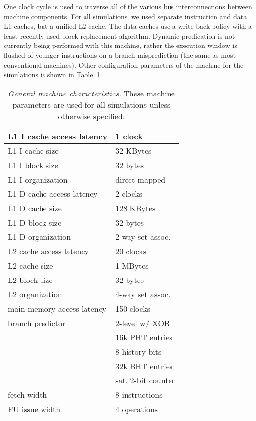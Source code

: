 \documentclass[10pt,dvips]{article}
\begin{document}
One clock cycle is used to traverse all of the
various bus interconnections between machine components.
For all simulations, we used separate instruction and
data L1 caches, but a unified L2 cache.
The data caches use a write-back policy with a least recently used
block replacement algorithm.
Dynamic predication is not
currently being performed with this machine, rather
the execution window is flushed of younger instructions
on a branch misprediction (the same as most conventional machines).
Other configuration parameters of the machine for the
simulations is shown in Table~\ref{tab:baseline}.

%
\begin{table}
\begin{center}
\caption{{\em General machine characteristics.}
These machine parameters are used for all simulations
unless otherwise specified.}
\label{tab:baseline}
\scriptsize{
\begin{tabular}{|l|l|}
\hline 
L1 I cache access latency&1 clock\\
\hline
L1 I cache size&32 KBytes\\
\hline
L1 I block size&32 bytes\\
\hline
L1 I organization&direct mapped\\
%
\hline 
L1 D cache access latency&2 clocks\\
\hline
L1 D cache size&128 KBytes\\
\hline
L1 D block size&32 bytes\\
\hline
L1 D organization&2-way set assoc.\\
%
\hline
L2 cache access latency&20 clocks\\
\hline
L2 cache size&1 MBytes\\
\hline
L2 block size&32 bytes\\
\hline
L2 organization&4-way set assoc.\\
%
\hline
main memory access latency&150 clocks\\
\hline
branch predictor&2-level w/ XOR\\
\cline{2-2}
 & 16k PHT entries\\
\cline{2-2}
 & 8 history bits\\
\cline{2-2}
 & 32k BHT entries\\
\cline{2-2}
 & sat. 2-bit counter\\
\hline
fetch width & 8 instructions \\
\hline
FU issue width & 4 operations \\
\hline 
\end{tabular}
}
\end{center}
\end{table}
%
\end{document}
